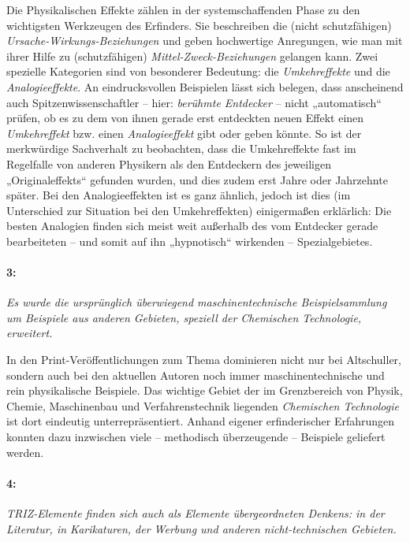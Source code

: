 \documentclass[12pt,a4paper]{article}
\newcommand{\these}[2]{\paragraph{#1:} \emph{#2}\par}
\begin{document}
Die Physikalischen Effekte zählen in der systemschaffenden Phase zu den
wichtigsten Werkzeugen des Erfinders. Sie beschreiben die (nicht
schutzfähigen) \emph{Ursache-Wirkungs-Beziehungen} und geben hochwertige
Anregungen, wie man mit ihrer Hilfe zu (schutzfähigen)
\emph{Mittel-Zweck-Beziehungen} gelangen kann. Zwei spezielle Kategorien sind
von besonderer Bedeutung: die \emph{Umkehreffekte} und die
\emph{Analogieeffekte}.  An eindrucksvollen Beispielen lässt sich belegen,
dass anscheinend auch Spitzenwissenschaftler – hier: \emph{berühmte Entdecker}
– nicht „automatisch“ prüfen, ob es zu dem von ihnen gerade erst entdeckten
neuen Effekt einen \emph{Umkehreffekt} bzw. einen \emph{Analogieeffekt} gibt
oder geben könnte. So ist der merkwürdige Sachverhalt zu beobachten, dass die
Umkehreffekte fast im Regelfalle von anderen Physikern als den Entdeckern des
jeweiligen „Originaleffekts“ gefunden wurden, und dies zudem erst Jahre oder
Jahrzehnte später. Bei den Analogieeffekten ist es ganz ähnlich, jedoch ist
dies (im Unterschied zur Situation bei den Umkehreffekten) einigermaßen
erklärlich: Die besten Analogien finden sich meist weit außerhalb des vom
Entdecker gerade bearbeiteten – und somit auf ihn „hypnotisch“ wirkenden –
Spezialgebietes.

\these{3}{Es wurde die ursprünglich überwiegend maschinentechnische
  Beispielsammlung um Beispiele aus anderen Gebieten, speziell der Chemischen
  Technologie, erweitert.}

In den Print-Veröffentlichungen zum Thema dominieren nicht nur bei
Altschuller, sondern auch bei den aktuellen Autoren noch immer
maschinentechnische und rein physikalische Beispiele. Das wichtige Gebiet der
im Grenzbereich von Physik, Chemie, Maschinenbau und Verfahrenstechnik
liegenden \emph{Chemischen Technologie} ist dort eindeutig unterrepräsentiert.
Anhand eigener erfinderischer Erfahrungen konnten dazu inzwischen viele –
methodisch überzeugende – Beispiele geliefert werden.

\these{4}{TRIZ-Elemente finden sich auch als Elemente übergeordneten Denkens:
  in der Literatur, in Karikaturen, der Werbung und anderen nicht-technischen
  Gebieten.}
\end{document}
